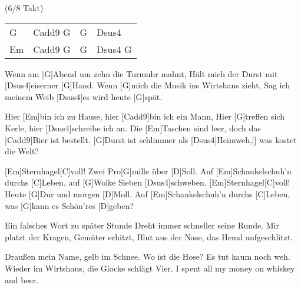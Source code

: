 
{ \footnotesize (6/8 Takt)}

\begin{guitar}
	{\footnotesize\begin{tabular}{l|l|l|l}
			G & Cadd9 G & G & Dsus4 \\
			Em & Cadd9 G & G & Dsus4 G 
	\end{tabular}}
	
	Wenn am [G]Abend um zehn die Turmuhr mahnt,
	Hält mich der Durst mit [Dsus4]eiserner [G]Hand.
	Wenn [G]mich die Musik ins Wirtshaus zieht,
	Sag ich meinem Weib [Dsus4]es wird heute [G]spät.
	
	Hier [Em]bin ich zu Hause, hier [Cadd9]bin ich ein Mann,
	Hier [G]treffen sich Kerle, hier [Dsus4]schreibe ich an.
	Die [Em]Taschen sind leer, doch das [Cadd9]Bier ist bestellt.
	[G]Durst ist schlimmer als [Dsus4]Heimweh,[]{ was} kostet die Welt?
	
	[Em]Sternhagel[C]voll! Zwei Pro[G]mille über [D]Soll.
	Auf [Em]Schaukelschuh'n durchs [C]Leben, auf [G]Wolke Sieben [Dsus4]schweben.
	[Em]Sternhagel[C]voll! Heute [G]Dur und morgen [D]Moll.
	Auf [Em]Schaukelschuh'n durchs [C]Leben, was [G]kann es Schön'res [D]geben?
	
	Ein falsches Wort zu später Stunde
	Dreht immer schneller seine Runde.
	Mir platzt der Kragen, Gemüter erhitzt,
	Blut aus der Nase, das Hemd aufgeschlitzt.

	Draußen mein Name, gelb im Schnee.
	Wo ist die Hose? Es tut kaum noch weh.
	Wieder im Wirtshaus, die Glocke schlägt Vier.
	I spent all my money on whiskey and beer.
	
	 
	
	
	 
\end{guitar}